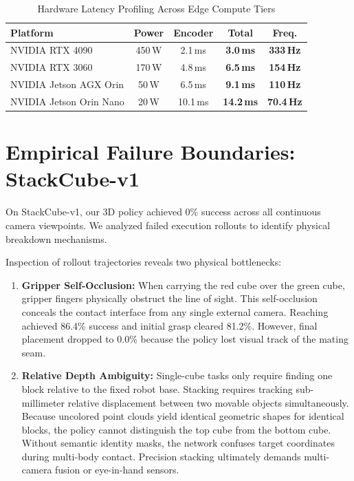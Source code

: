 \documentclass[conference]{IEEEtran}
\begin{document}
\begin{table}[t]
\caption{Hardware Latency Profiling Across Edge Compute Tiers}
\begin{center}
\begin{tabular}{lcccc}
\toprule
\textbf{Platform} & \textbf{Power} & \textbf{Encoder} & \textbf{Total} & \textbf{Freq.} \\
\midrule
NVIDIA RTX 4090 & 450\,W & 2.1\,ms & \textbf{3.0\,ms} & \textbf{333\,Hz} \\
NVIDIA RTX 3060 & 170\,W & 4.8\,ms & \textbf{6.5\,ms} & \textbf{154\,Hz} \\
NVIDIA Jetson AGX Orin & 50\,W & 6.5\,ms & \textbf{9.1\,ms} & \textbf{110\,Hz} \\
NVIDIA Jetson Orin Nano & 20\,W & 10.1\,ms & \textbf{14.2\,ms} & \textbf{70.4\,Hz} \\
\bottomrule
\end{tabular}
\label{tab_edge}
\end{center}
\end{table}

\section{Empirical Failure Boundaries: StackCube-v1}
On StackCube-v1, our 3D policy achieved 0\% success across all continuous camera viewpoints. We analyzed failed execution rollouts to identify physical breakdown mechanisms.

Inspection of rollout trajectories reveals two physical bottlenecks:
\begin{enumerate}
\item \textbf{Gripper Self-Occlusion:} When carrying the red cube over the green cube, gripper fingers physically obstruct the line of sight. This self-occlusion conceals the contact interface from any single external camera. Reaching achieved 86.4\% success and initial grasp cleared 81.2\%. However, final placement dropped to 0.0\% because the policy lost visual track of the mating seam.
\item \textbf{Relative Depth Ambiguity:} Single-cube tasks only require finding one block relative to the fixed robot base. Stacking requires tracking sub-millimeter relative displacement between two movable objects simultaneously. Because uncolored point clouds yield identical geometric shapes for identical blocks, the policy cannot distinguish the top cube from the bottom cube. Without semantic identity masks, the network confuses target coordinates during multi-body contact. Precision stacking ultimately demands multi-camera fusion or eye-in-hand sensors.
\end{enumerate}
\end{document}
